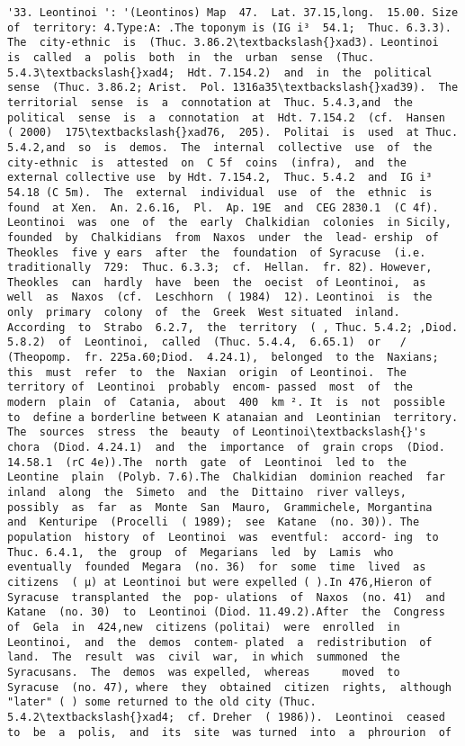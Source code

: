 \documentclass[11pt]{article}
\begin{document}
\begin{Verbatim}[commandchars=\\\{\}]
         '33. Leontinoi ': '(Leontinos) Map  47.  Lat. 37.15,long.  15.00. Size of  territory: 4.Type:A: .The toponym is (IG i³  54.1;  Thuc. 6.3.3).  The  city-ethnic  is  (Thuc. 3.86.2\textbackslash{}xad3). Leontinoi  is  called  a  polis  both  in  the  urban  sense  (Thuc. 5.4.3\textbackslash{}xad4;  Hdt. 7.154.2)  and  in  the  political  sense  (Thuc. 3.86.2; Arist.  Pol. 1316a35\textbackslash{}xad39).  The  territorial  sense  is  a  connotation at  Thuc. 5.4.3,and  the  political  sense  is  a  connotation  at  Hdt. 7.154.2  (cf.  Hansen  ( 2000)  175\textbackslash{}xad76,  205).  Politai  is  used  at Thuc. 5.4.2,and  so  is  demos.  The  internal  collective  use  of  the city-ethnic  is  attested  on  C 5f  coins  (infra),  and  the  external collective use  by Hdt. 7.154.2,  Thuc. 5.4.2  and  IG i³  54.18 (C 5m).  The  external  individual  use  of  the  ethnic  is  found  at Xen.  An. 2.6.16,  Pl.  Ap. 19E  and  CEG 2830.1  (C 4f). Leontinoi  was  one  of  the  early  Chalkidian  colonies  in Sicily,  founded  by  Chalkidians  from  Naxos  under  the  lead- ership  of  Theokles  five y ears  after  the  foundation  of Syracuse  (i.e.  traditionally  729:  Thuc. 6.3.3;  cf.  Hellan.  fr. 82). However,  Theokles  can  hardly  have  been  the  oecist  of Leontinoi,  as  well  as  Naxos  (cf.  Leschhorn  ( 1984)  12). Leontinoi  is  the  only  primary  colony  of  the  Greek  West situated  inland.  According  to  Strabo  6.2.7,  the  territory  ( , Thuc. 5.4.2; ,Diod.  5.8.2)  of  Leontinoi,  called  (Thuc. 5.4.4,  6.65.1)  or   / (Theopomp.  fr. 225a.60;Diod.  4.24.1),  belonged  to the  Naxians;  this  must  refer  to  the  Naxian  origin  of Leontinoi.  The  territory of  Leontinoi  probably  encom- passed  most  of  the  modern  plain  of  Catania,  about  400  km ². It  is  not  possible  to  define a borderline between K atanaian and  Leontinian  territory.  The  sources  stress  the  beauty  of Leontinoi\textbackslash{}'s  chora  (Diod. 4.24.1)  and  the  importance  of  grain crops  (Diod. 14.58.1  (rC 4e)).The  north  gate  of  Leontinoi  led to  the  Leontine  plain  (Polyb. 7.6).The  Chalkidian  dominion reached  far  inland  along  the  Simeto  and  the  Dittaino  river valleys,  possibly  as  far  as  Monte  San  Mauro,  Grammichele, Morgantina  and  Kenturipe  (Procelli  ( 1989);  see  Katane  (no. 30)). The  population  history  of  Leontinoi  was  eventful:  accord- ing  to  Thuc. 6.4.1,  the  group  of  Megarians  led  by  Lamis  who eventually  founded  Megara  (no. 36)  for  some  time  lived  as citizens  ( µ) at Leontinoi but were expelled ( ).In 476,Hieron of  Syracuse  transplanted  the  pop- ulations  of  Naxos  (no. 41)  and  Katane  (no. 30)  to  Leontinoi (Diod. 11.49.2).After  the  Congress  of  Gela  in  424,new  citizens (politai)  were  enrolled  in  Leontinoi,  and  the  demos  contem- plated  a  redistribution  of  land.  The  result  was  civil  war,  in which  summoned  the  Syracusans.  The  demos  was expelled,  whereas     moved  to  Syracuse  (no. 47), where  they  obtained  citizen  rights,  although  "later" ( ) some returned to the old city (Thuc.  5.4.2\textbackslash{}xad4;  cf. Dreher  ( 1986)).  Leontinoi  ceased  to  be  a  polis,  and  its  site  was turned  into  a  phrourion  of  
\end{Verbatim}
\end{document}
